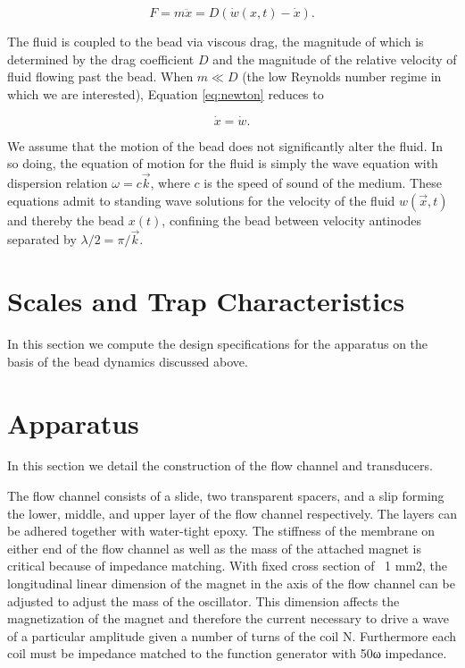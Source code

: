 \begin{equation}
F = m \ddot{x} = D\left(\dot{w}\left(x,t\right)-\dot{x}\right)\label{eq:newton}.
\end{equation}

The fluid is coupled to the bead via viscous drag, the magnitude of which is determined by the drag coefficient $D$ and the magnitude of the relative velocity of fluid flowing past the bead.   When $m \ll D$ (the low Reynolds number regime in which we are interested), Equation \ref{eq:newton} reduces to

\begin{equation}
\dot{x} = \dot{w}.
\end{equation}

We assume that the motion of the bead does not significantly alter the fluid.  In so doing, the equation of motion for the fluid is simply the wave equation with dispersion relation $\omega = c \vec{k}$, where $c$ is the speed of sound of the medium.  These equations admit to standing wave solutions for the velocity of the fluid $w\left(\vec{x},t\right)$ and thereby the bead $x\left(t\right)$, confining the bead between velocity antinodes separated by $\lambda/2 = \pi/\vec{k}$.

\section{Scales and Trap Characteristics}

In this section we compute the design specifications for the apparatus on the basis of the bead dynamics discussed above.



\section{Apparatus}

In this section we detail the construction of the flow channel and transducers.

The flow channel consists of a slide, two transparent spacers, and a slip forming the lower, middle, and upper layer of the flow channel respectively. The layers can be adhered together with water-tight epoxy. The stiffness of the membrane on either end of the flow channel as well as the mass of the attached magnet is critical because of impedance matching. With fixed cross section of ~1 mm2, the longitudinal linear dimension of the magnet in the axis of the flow channel can be adjusted to adjust the mass of the oscillator. This dimension affects the magnetization of the magnet and therefore the current necessary to drive a wave of a particular amplitude given a number of turns of the coil N. Furthermore each coil must be impedance matched to the function generator with 50ω impedance.

